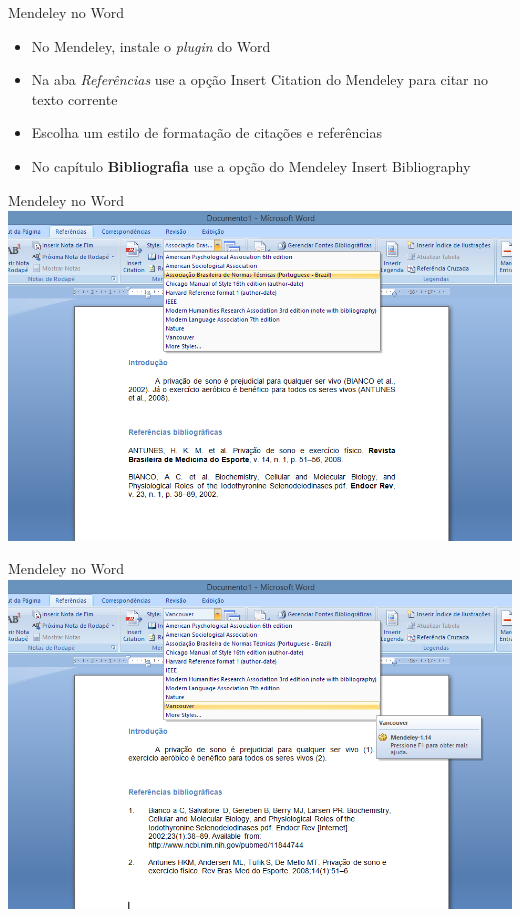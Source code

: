 \documentclass{beamer}
\begin{document}
\begin{frame}{Mendeley no Word}
  \begin{itemize}
  \item No Mendeley, instale o {\em plugin} do Word
  \item Na aba {\em Referências} use a opção \alert{Insert Citation}
    do Mendeley para citar no texto corrente
  \item Escolha um estilo de formatação de citações e referências
  \item No capítulo {\bf Bibliografia} use a opção do Mendeley
    \alert{Insert Bibliography}
  \end{itemize}
\end{frame}

\begin{frame}{Mendeley no Word}
  \includegraphics[width=1.1\textwidth]{Referencias/mendeley-word-ABNT}
\end{frame}

\begin{frame}{Mendeley no Word}
  \includegraphics[width=1.1\textwidth]{Referencias/mendeley-word-vancouver}
\end{frame}
\end{document}
